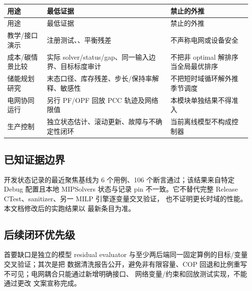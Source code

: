 \begin{center}\footnotesize
\begin{longtable}{@{}L{4.0cm}L{5.4cm}L{5.8cm}@{}}
\toprule
用途 & 最低证据 & 禁止的外推\\\midrule
\endfirsthead
\toprule 用途 & 最低证据 & 禁止的外推\\\midrule\endhead
教学/接口演示 & 注册测试、、平衡残差 & 不声称电网或设备安全\\
成本/碳情景比较 & 实际 solver/status/gap、同一输入边界、目标标度审计 & 不把非 optimal 解排序当全局最优排序\\
储能规划研究 & 末态口径、库存残差、步长/保持率解释、敏感性 & 不把短时域循环解外推季节调度\\
电网协同运行 & 另行 PF/OPF 回放 PCC 轨迹及网络限值 & 本模块单独结果不得准入\\
生产控制 & 独立状态估计、滚动更新、故障与不确定性闭环 & 当前离线模型不构成控制器\\
\bottomrule
\end{longtable}
\end{center}

\subsection{已知证据边界}

开发状态记录的最近聚焦基线为 6 个用例、106 个断言通过；该结果来自特定 Debug 配置且本地
MIPSolvers 状态与记录 pin 不一致。它不替代完整 Release CTest、sanitizer、另一 MILP 引擎逐变量交叉验证，
也不证明更长时域的性能。本文档修改后的实跑结果以
 最新条目为准。

\subsection{后续闭环优先级}

首要缺口是独立的模型 residual evaluator 与至少两后端同一固定算例的目标/变量交叉验证；其次是把
数据清洗报告公开，避免非有限容量、COP 回退和比例重写不可见；电网耦合只能通过新增明确接口、
网络变量/约束和回放测试实现，不能通过更改  文案宣称完成。

